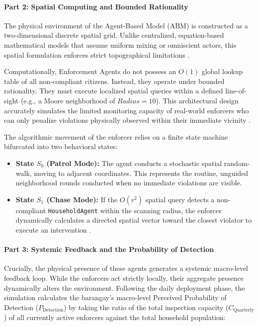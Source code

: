 \paragraph{Part 2: Spatial Computing and Bounded Rationality}

The physical environment of the Agent-Based Model (ABM) is constructed as a two-dimensional discrete spatial grid. Unlike centralized, equation-based mathematical models that assume uniform mixing or omniscient actors, this spatial formulation enforces strict topographical limitations \citep{Meng2018}. 

Computationally, Enforcement Agents do not possess an $O(1)$ global lookup table of all non-compliant citizens. Instead, they operate under bounded rationality. They must execute localized spatial queries within a defined line-of-sight (e.g., a Moore neighborhood of $Radius = 10$). This architectural design accurately simulates the limited monitoring capacity of real-world enforcers who can only penalize violations physically observed within their immediate vicinity \citep{Dalugdog2021}.

The algorithmic movement of the enforcer relies on a finite state machine bifurcated into two behavioral states:
\begin{itemize}
    \item \textbf{State $S_0$ (Patrol Mode):} The agent conducts a stochastic spatial random-walk, moving to adjacent coordinates. This represents the routine, unguided neighborhood rounds conducted when no immediate violations are visible.
    \item \textbf{State $S_1$ (Chase Mode):} If the $O(r^2)$ spatial query detects a non-compliant \texttt{HouseholdAgent} within the scanning radius, the enforcer dynamically calculates a directed spatial vector toward the closest violator to execute an intervention \citep{Zhao2022}.
\end{itemize}

\paragraph{Part 3: Systemic Feedback and the Probability of Detection}

Crucially, the physical presence of these agents generates a systemic macro-level feedback loop. While the enforcers act strictly locally, their aggregate presence dynamically alters the environment. Following the daily deployment phase, the simulation calculates the barangay's macro-level Perceived Probability of Detection ($P_{\mathrm{Detection}}$) by taking the ratio of the total inspection capacity ($C_{\mathrm{Quarterly}}$) of all currently active enforcers against the total household population:

